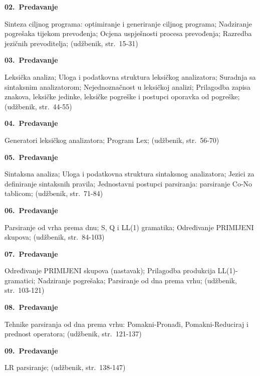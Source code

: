 \documentclass[times, 12pt, utf8]{book}
\newenvironment{myindentpar}[1]%
{\begin{list}{}%
         {\setlength{\leftmargin}{#1}}%
         \item[]%
}
{\end{list}}
\begin{document}
\textbf{02.~Predavanje} 
\begin{myindentpar}{30pt}
Sinteza ciljnog programa: optimiranje i generiranje ciljnog programa; Nadziranje pogrešaka tijekom prevođenja; Ocjena uspješnosti procesa prevođenja; Razredba jezičnih prevoditelja; (udžbenik, str.~15-31) 
\end{myindentpar}

\textbf{03.~Predavanje}
\begin{myindentpar}{30pt}
Leksička analiza; Uloga i podatkovna struktura leksičkog analizatora; Suradnja sa sintaksnim analizatorom; Nejednoznačnost u leksičkoj analizi; Prilagodba zapisa znakova, leksičke jedinke, leksičke pogreške i postupci oporavka od pogreške; (udžbenik, str.~44-55)
\end{myindentpar}

\textbf{04.~Predavanje}
\begin{myindentpar}{30pt}
Generatori leksičkog analizatora; Program Lex; (udžbenik, str.~56-70)
\end{myindentpar}

\textbf{05.~Predavanje}
\begin{myindentpar}{30pt}
Sintaksna analiza; Uloga i podatkovna struktura sintaksnog analizatora; Jezici za definiranje sintaksnih pravila; Jednostavni postupci parsiranja: parsiranje Co-No tablicom; (udžbenik, str.~71-84)
\end{myindentpar}

\textbf{06.~Predavanje}
\begin{myindentpar}{30pt}
Parsiranje od vrha prema dnu; S, Q i LL(1) gramatika; Određivanje PRIMIJENI skupova; (udžbenik, str.~84-103) 
\end{myindentpar}

\textbf{07.~Predavanje}
\begin{myindentpar}{30pt}
Određivanje PRIMIJENI skupova (nastavak); Prilagodba produkcija LL(1)-gramatici; Nadziranje pogrešaka; Parsiranje od dna prema vrhu; (udžbenik, str.~103-121)
\end{myindentpar}

\textbf{08.~Predavanje}
\begin{myindentpar}{30pt}
Tehnike parsiranja od dna prema vrhu: Pomakni-Pronađi, Pomakni-Reduciraj i prednost operatora; (udžbenik, str.~121-137) 
\end{myindentpar}

\textbf{09.~Predavanje}
\begin{myindentpar}{30pt}
LR parsiranje; (udžbenik, str.~138-147)
\end{myindentpar}
\end{document}
